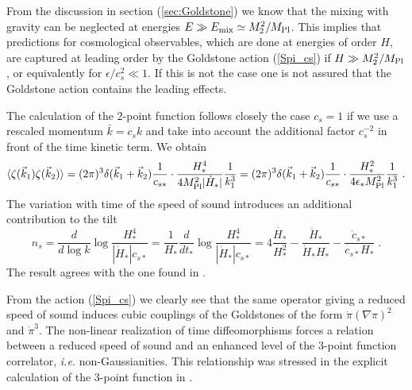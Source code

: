 \documentclass[12pt,letterpaper]{article}
\def\be{\begin{eqnarray}}
\def\ee{\end{eqnarray}}
\begin{document}
{From the discussion in section (\ref{sec:Goldstone}) we know that the
mixing with gravity can be neglected at energies $E \gg E_{\rm mix}
\simeq M_2^2/M_{\rm Pl}$. This implies that predictions for cosmological
observables, which are done at energies of order $H$, are captured at leading order by the
Goldstone action (\ref{Spi_cs}) if $H \gg M_2^2/M_{\rm Pl}$, or
equivalently for $\epsilon/c_s^2 \ll 1$. If this is not the case one
is not assured that the Goldstone action contains the leading effects.

The calculation of the 2-point function follows closely the case
$c_s=1$ if we use a rescaled momentum $\bar k=c_s k$ and
take into account the additional factor $c_s^{-2}$ in front of the
time kinetic term. We obtain
\be
\label{eq:spectrumzetacs}
\langle \zeta(\vec k_1) \zeta(\vec k_2)\rangle = (2 \pi)^3 \delta(\vec
k_1 + \vec k_2)  \frac1{c_{s*}} \cdot \frac{H^4_*}{4 M_{\rm Pl}^2 |\dot H_*|}\frac{1}{k_1^3} = (2
\pi)^3 \delta(\vec k_1 + \vec k_2) \frac1{c_{s*}} \cdot \frac{H_*^2}{4 \epsilon_* M_{\rm Pl}^2} \frac{1}{k_1^3} \;.
\ee
The variation with time of the speed of sound introduces an additional
contribution to the tilt
\begin{equation}
n_s=\frac{d}{d \log k}\log \frac{H^4_{*}}{|\dot{H}_*|
c_{s*}}=\frac{1}{H_*}\frac{d}{dt_*}\log \frac{H^4_{*}}{|\dot{H}_*|
c_{s*}} =4\frac{\dot{H_*}}{H^2_*}-\frac{\ddot{H}_*}{\dot{H}_*
H_* }-\frac{\dot{c}_{s*}}{c_{s*}H_{*}} \;.
\end{equation}
The result agrees with the one found in \cite{Garriga:1999vw}.


From the action (\ref{Spi_cs}) we clearly see that the same operator
giving a reduced speed of sound induces cubic couplings of the
Goldstones of the form $\dot{\pi}(\nabla\pi)^2$ and $\dot\pi^3$. The
non-linear realization of time diffeomorphisms forces a relation
between a reduced speed of sound and an enhanced level of
the 3-point function correlator, {\em i.e.} non-Gaussianities. This
relationship was stressed in the explicit  calculation of the
3-point function in \cite{Chen:2006nt}.

}
\end{document}
